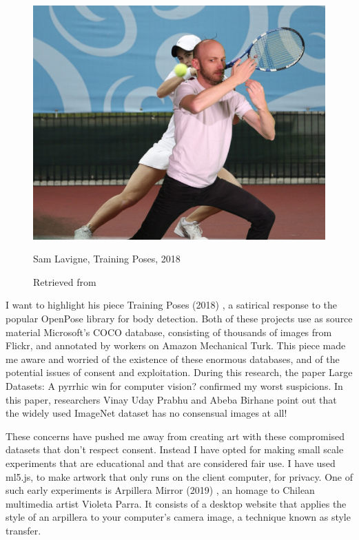 \begin{figure}[ht]
  \centering
    \includegraphics[width=0.75\linewidth,height=0.25\textheight,keepaspectratio]{images/sam-lavigne-training-poses.jpg}
  \caption{Sam Lavigne, Training Poses, 2018}
  \caption*{Retrieved from \cite{website-sam-lavigne-training-poses}}
  \label{fig:sam-lavigne-training-poses}
\end{figure}

I want to highlight his piece Training Poses (2018) \cite{website-sam-lavigne-training-poses}, a satirical response to the popular OpenPose \cite{website-openpose} library for body detection. Both of these projects use as source material Microsoft's \acrfull{COCO} database, consisting of thousands of images from Flickr, and annotated by workers on Amazon Mechanical Turk. This piece made me aware and worried of the existence of these enormous databases, and of the potential issues of consent and exploitation. During this research, the paper Large Datasets: A \gls{pyrrhic} win for computer vision? \cite{DBLP:journals/corr/abs-2006-16923} confirmed my worst suspicions. In this paper, researchers Vinay Uday Prabhu and Abeba Birhane point out that the widely used ImageNet dataset has no consensual images at all!

These concerns have pushed me away from creating art with these compromised datasets that don't respect consent. Instead I have opted for making small scale experiments that are educational and that are considered fair use. I have used ml5.js, to make artwork that only runs on the client computer, for privacy. One of such early experiments is Arpillera Mirror (2019) \cite{website-arpillera-mirror}, an homage to Chilean multimedia artist Violeta Parra. It consists of a desktop website that applies the style of an arpillera to your computer's camera image, a technique known as style transfer.

